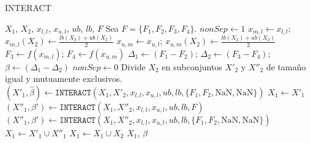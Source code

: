 \begin{algorithm}
\caption{INTERACT}
\label{alg:INTERACT_ERDG}
\begin{algorithmic}[1]
\REQUIRE $X_1$, $X_2$, $x_{l,l}$, $x_{u,l}$, $ub$, $lb$, $F$
\STATE Sea $F = \{F_1, F_2, F_3, F_4\}$.
\STATE $nonSep \gets 1$
    \STATE $x_{m,l} \gets x_{l,l}$; $x_{m,l}(X_2) \gets \frac{lb(X_2) + ub(X_2)}{2}$
    \STATE $x_{u,m} \gets x_{u,l}$; $x_{u,m}(X_2) \gets \frac{lb(X_2) + ub(X_2)}{2}$
    \STATE $F_3 \gets f(x_{m,l})$; $F_4 \gets f(x_{u,m})$
    \STATE $\Delta_1 \gets (F_1 - F_2)$; $\Delta_2 \gets (F_3 - F_4)$; $\beta \gets (\Delta_1 - \Delta_2)$
    \IF{$|\beta| \leq \epsilon$}
        \STATE $nonSep \gets 0$
    \ENDIF
\ENDIF
{}
        \STATE Divide $X_2$ en subconjuntos $X'_2$ y $X''_2$ de tamaño igual y mutuamente exclusivos.
        \STATE $(X'_1, \hat{\beta}) \gets \texttt{INTERACT}(X_1, X'_2, x_{l,l}, x_{u,l}, ub, lb, \{F_1, F_2, \text{NaN}, \text{NaN}\})$
        \IF{$\beta \neq \hat{\beta}$}
            \STATE $X_1 \gets X'_1$
        \ELSE
                \STATE $(X''_1, \beta') \gets \texttt{INTERACT}(X_1, X''_2, x_{l,l}, x_{u,l}, ub, lb, F)$
            \ELSE
                \STATE $(X''_1, \beta') \gets \texttt{INTERACT}(X_1, X''_2, x_{l,l}, x_{u,l}, ub, lb, \{F_1, F_2, \text{NaN}, \text{NaN}\})$
            \ENDIF
            \STATE $X_1 \gets X'_1 \cup X''_1$
        \ENDIF
    \ELSE
        \STATE $X_1 \gets X_1 \cup X_2$
    \ENDIF
\ENDIF
\RETURN $X_1$, $\beta$
\end{algorithmic}
\end{algorithm}




\endinput
